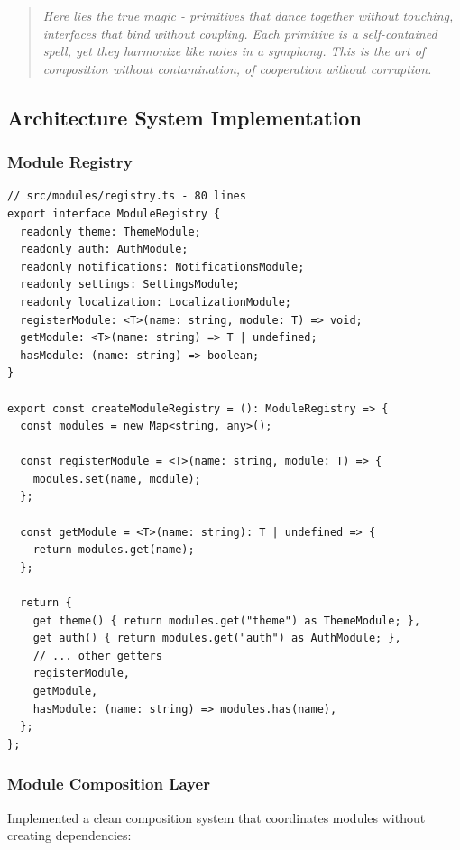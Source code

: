 \documentclass[11pt]{article}
\begin{document}
\begin{quote}
\emph{Here lies the true magic - primitives that dance together without touching, interfaces that bind without coupling. Each primitive is a self-contained spell, yet they harmonize like notes in a symphony. This is the art of composition without contamination, of cooperation without corruption.}
\end{quote}

\subsection{Architecture System Implementation}

\subsubsection{Module Registry}

\begin{lstlisting}[style=typescript]
// src/modules/registry.ts - 80 lines
export interface ModuleRegistry {
  readonly theme: ThemeModule;
  readonly auth: AuthModule;
  readonly notifications: NotificationsModule;
  readonly settings: SettingsModule;
  readonly localization: LocalizationModule;
  registerModule: <T>(name: string, module: T) => void;
  getModule: <T>(name: string) => T | undefined;
  hasModule: (name: string) => boolean;
}

export const createModuleRegistry = (): ModuleRegistry => {
  const modules = new Map<string, any>();
  
  const registerModule = <T>(name: string, module: T) => {
    modules.set(name, module);
  };
  
  const getModule = <T>(name: string): T | undefined => {
    return modules.get(name);
  };
  
  return {
    get theme() { return modules.get("theme") as ThemeModule; },
    get auth() { return modules.get("auth") as AuthModule; },
    // ... other getters
    registerModule,
    getModule,
    hasModule: (name: string) => modules.has(name),
  };
};
\end{lstlisting}

\subsubsection{Module Composition Layer}

Implemented a clean composition system that coordinates modules without creating dependencies:
\end{document}
